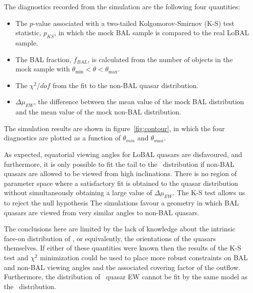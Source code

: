 The diagnostics recorded from the simulation are the following four
quantities:
\begin{itemize}
	\item The $p$-value associated with a two-tailed Kolgomorov-Smirnov (K-S) 
	test statistic, $p_{KS}$, in which the mock BAL sample is compared
	to the real LoBAL sample.
	\item The BAL fraction, $f_{BAL}$, is calculated from the 
	number of objects in the mock sample with $\theta_{\mathrm{min}}<\theta<\theta_{\mathrm{max}}$.
	\item The $\chi^2/dof$ from the fit to the non-BAL quasar distribution.
	\item $\Delta \mu_{EW}$, the difference between the mean value of the mock BAL
	distribution and the mean value of the mock non-BAL distribution.
\end{itemize}
The simulation results are shown in figure~\ref{fig:contour}, in which the 
four diagnostics are plotted as a function of $\theta_{min}$ 
and $\theta_{max}$. 

As expected, equatorial viewing angles for LoBAL quasars 
are disfavoured, and furthermore, it is only possible to fit
the tail to the \ewo\ distribution if non-BAL quasars are allowed 
to be viewed from high inclinations. There is no region of parameter
space where a satisfactory fit is obtained to the quasar distribution
without simultaneously obtaining a large value of $\Delta \mu_{EW}$. The
K-S test allows us to reject the null hypothesis
The simulations favour a geometry in which BAL quasars are viewed
from very similar angles to non-BAL quasars.

The conclusions here are limited by the lack of knowledge about the 
intrinsic face-on distribution of \ewo, or equivalently,
the orientations of the quasars themselves. If either of these
quantities were known then the results of the
K-S test and $\chi^2$ minimization could be used
to place more robust constraints on BAL and non-BAL viewing angles 
and the associated covering factor of the outflow.
Furthermore, the distribution of \civ\ quasar EW cannot be fit by 
the same model as the \ewo\ distribution.

